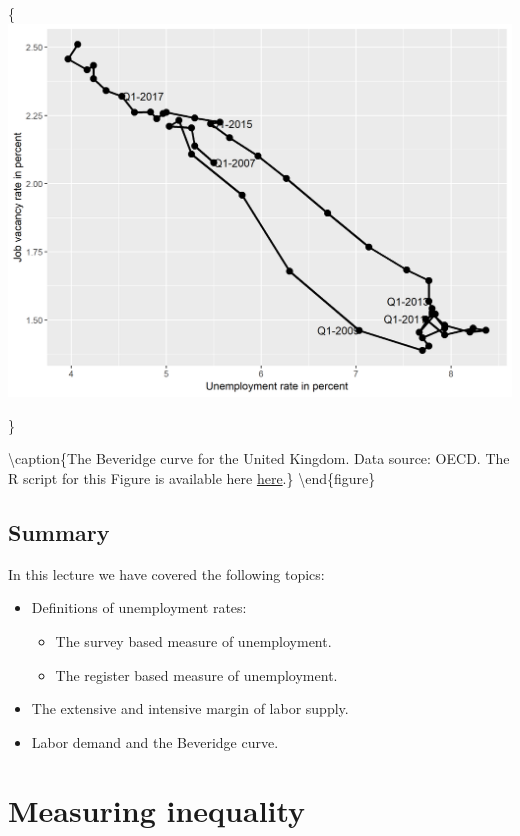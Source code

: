 \documentclass[]{book}
\providecommand{\tightlist}{%
  \setlength{\itemsep}{0pt}\setlength{\parskip}{0pt}}
\begin{document}
\{\centering \includegraphics[width=0.89\linewidth]{_resources/chapter_labour/fig16}

\}

\textbackslash caption\{The Beveridge curve for the United Kingdom. Data source: OECD. The R script for this Figure is available here \href{https://www.hhsievertsen.net/economicdata/notes/lecture12/rmaterial/lecnote_12_script_for_fig10.R}{here}.\}\label{fig:labour4}
\textbackslash end\{figure\}

\hypertarget{summary-5}{%
\section{Summary}\label{summary-5}}

In this lecture we have covered the following topics:

\begin{itemize}
\tightlist
\item
  Definitions of unemployment rates:

  \begin{itemize}
  \tightlist
  \item
    The survey based measure of unemployment.
  \item
    The register based measure of unemployment.
  \end{itemize}
\item
  The extensive and intensive margin of labor supply.
\item
  Labor demand and the Beveridge curve.
\end{itemize}

\hypertarget{measuring-inequality}{%
\chapter{Measuring inequality}\label{measuring-inequality}}
\end{document}
